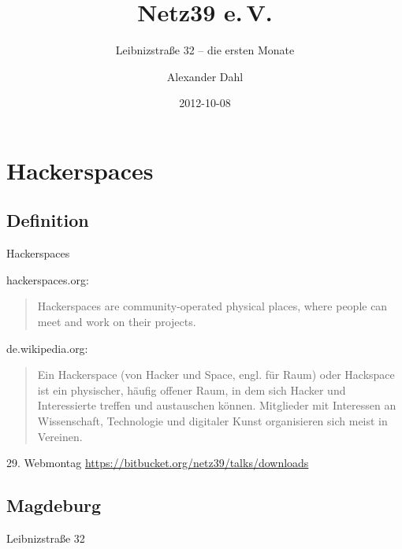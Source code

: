 \documentclass[hyperref={pdfpagelabels=false}]{beamer}
\title[Netz39 e.\,V.]{Netz39 e.\,V.}
\subtitle{Leibnizstraße 32 -- die ersten Monate}
\author{Alexander Dahl}
\institute[netz39.de]{\url{http://www.netz39.de/}}
\date{2012-10-08}
\begin{document}
\begin{frame}
	\titlepage
\end{frame}


\section{Hackerspaces}

\subsection{Definition}

\begin{frame}{Hackerspaces}
    \begin{block}{hackerspaces.org:}
        \begin{quote}
            Hackerspaces are community-operated physical places, where
            people can meet and work on their projects.
        \end{quote}
    \end{block}
    \pause
    \begin{block}{de.wikipedia.org:}
        \begin{quote}
            Ein Hackerspace (von Hacker und Space, engl. für Raum) oder
            Hackspace ist ein physischer, häufig offener Raum, in dem
            sich Hacker und Interessierte treffen und austauschen
            können. Mitglieder mit Interessen an Wissenschaft,
            Technologie und digitaler Kunst organisieren sich meist in
            Vereinen.
        \end{quote}
    \end{block}
    \pause
    \begin{block}{29. Webmontag}
        \url{https://bitbucket.org/netz39/talks/downloads}
    \end{block}
\end{frame}

\subsection{Magdeburg}

\begin{frame}{Leibnizstraße 32}
    \begin{figure}
    \end{figure}
\end{frame}
\end{document}
